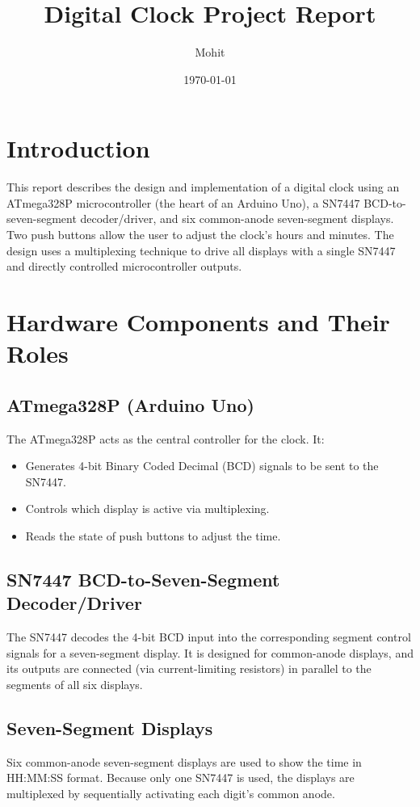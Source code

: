 \documentclass[12pt]{article}
\title{Digital Clock Project Report}
\author{Mohit}
\date{\today}
\begin{document}
\maketitle
\tableofcontents
\newpage

\section{Introduction}
This report describes the design and implementation of a digital clock using an ATmega328P microcontroller (the heart of an Arduino Uno), a SN7447 BCD-to-seven-segment decoder/driver, and six common-anode seven-segment displays. Two push buttons allow the user to adjust the clock’s hours and minutes. The design uses a multiplexing technique to drive all displays with a single SN7447 and directly controlled microcontroller outputs.

\section{Hardware Components and Their Roles}
\subsection{ATmega328P (Arduino Uno)}
The ATmega328P acts as the central controller for the clock. It:
\begin{itemize}
    \item Generates 4-bit Binary Coded Decimal (BCD) signals to be sent to the SN7447.
    \item Controls which display is active via multiplexing.
    \item Reads the state of push buttons to adjust the time.
\end{itemize}

\subsection{SN7447 BCD-to-Seven-Segment Decoder/Driver}
The SN7447 decodes the 4-bit BCD input into the corresponding segment control signals for a seven-segment display. It is designed for common-anode displays, and its outputs are connected (via current-limiting resistors) in parallel to the segments of all six displays.

\subsection{Seven-Segment Displays}
Six common-anode seven-segment displays are used to show the time in HH:MM:SS format. Because only one SN7447 is used, the displays are multiplexed by sequentially activating each digit's common anode.
\end{document}
